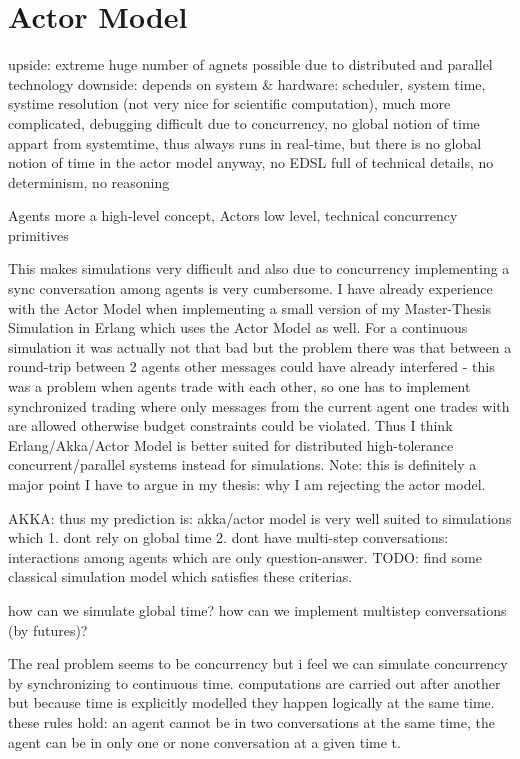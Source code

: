 \section{Actor Model}
upside: extreme huge number of agnets possible due to distributed and parallel technology 
downside: depends on system \& hardware: scheduler, system time, systime resolution (not very nice for scientific computation), much more complicated, debugging difficult due to concurrency, no global notion of time appart from systemtime, thus always runs in real-time, but there is no global notion of time in the actor model anyway, no EDSL full of technical details, no determinism, no reasoning

Agents more a high-level concept, Actors low level, technical concurrency primitives

This makes simulations very difficult and also due to concurrency implementing a sync conversation among agents is very cumbersome. I have already experience with the Actor Model when implementing a small version of my Master-Thesis Simulation in Erlang which uses the Actor Model as well. For a continuous simulation it was actually not that bad but the problem there was that between a round-trip between 2 agents other messages could have already interfered - this was a problem when agents trade with each other, so one has to implement synchronized trading where only messages from the current agent one trades with are allowed otherwise budget constraints could be violated. Thus I think Erlang/Akka/Actor Model is better suited for distributed high-tolerance concurrent/parallel systems instead for simulations. Note: this is definitely a major point I have to argue in my thesis: why I am rejecting the actor model.


AKKA: thus my prediction is: akka/actor model is very well suited to simulations which 1. dont rely on global time 2. dont have multi-step conversations: interactions among agents which are only question-answer. TODO: find some classical simulation model which satisfies these criterias.

how can we simulate global time? how can we implement multistep conversations (by futures)?

The real problem seems to be concurrency but i feel we can simulate concurrency by synchronizing to continuous time. computations are carried out after another but because time is explicitly modelled they happen logically at the same time. these rules hold: an agent cannot be in two conversations at the same time, the agent can be in only one or none conversation at a given time t.

